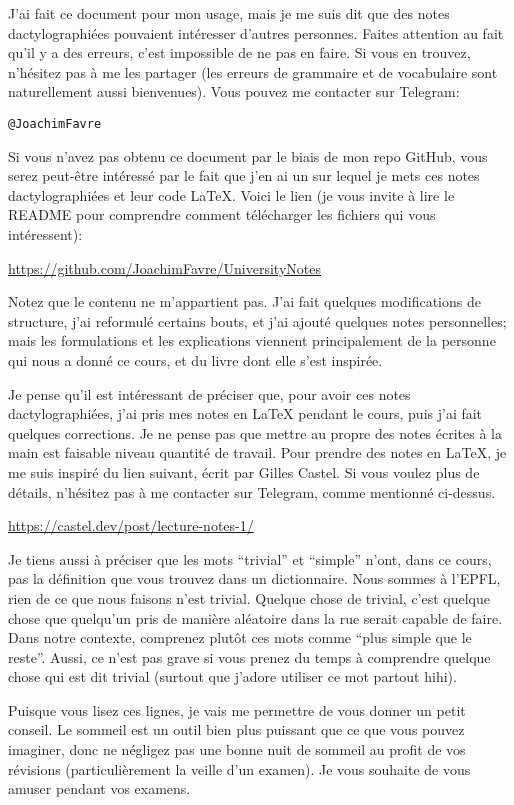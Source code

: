 J'ai fait ce document pour mon usage, mais je me suis dit que des notes dactylographiées pouvaient intéresser d'autres personnes. Faites attention au fait qu'il y a des erreurs, c'est impossible de ne pas en faire. Si vous en trouvez, n'hésitez pas à me les partager (les erreurs de grammaire et de vocabulaire sont naturellement aussi bienvenues). Vous pouvez me contacter sur Telegram:
\begin{center}
    \texttt{@JoachimFavre}
\end{center}

Si vous n'avez pas obtenu ce document par le biais de mon repo GitHub, vous serez peut-être intéressé par le fait que j'en ai un sur lequel je mets ces notes dactylographiées et leur code \LaTeX{}. Voici le lien (je vous invite à lire le README pour comprendre comment télécharger les fichiers qui vous intéressent):
\begin{center}
    \url{https://github.com/JoachimFavre/UniversityNotes}
\end{center}

Notez que le contenu ne m'appartient pas. J'ai fait quelques modifications de structure, j'ai reformulé certains bouts, et j'ai ajouté quelques notes personnelles; mais les formulations et les explications viennent principalement de la personne qui nous a donné ce cours, et du livre dont elle s'est inspirée.

Je pense qu'il est intéressant de préciser que, pour avoir ces notes dactylographiées, j'ai pris mes notes en \LaTeX{} pendant le cours, puis j'ai fait quelques corrections. Je ne pense pas que mettre au propre des notes écrites à la main est faisable niveau quantité de travail. Pour prendre des notes en \LaTeX{}, je me suis inspiré du lien suivant, écrit par Gilles Castel. Si vous voulez plus de détails, n'hésitez pas à me contacter sur Telegram, comme mentionné ci-dessus.
\begin{center}
    \url{https://castel.dev/post/lecture-notes-1/}
\end{center}

Je tiens aussi à préciser que les mots ``trivial'' et ``simple'' n'ont, dans ce cours, pas la définition que vous trouvez dans un dictionnaire. Nous sommes à l'EPFL, rien de ce que nous faisons n'est trivial. Quelque chose de trivial, c'est quelque chose que quelqu'un pris de manière aléatoire dans la rue serait capable de faire. Dans notre contexte, comprenez plutôt ces mots comme ``plus simple que le reste''. Aussi, ce n'est pas grave si vous prenez du temps à comprendre quelque chose qui est dit trivial (surtout que j'adore utiliser ce mot partout hihi).

Puisque vous lisez ces lignes, je vais me permettre de vous donner un petit conseil. Le sommeil est un outil bien plus puissant que ce que vous pouvez imaginer, donc ne négligez pas une bonne nuit de sommeil au profit de vos révisions (particulièrement la veille d'un examen). Je vous souhaite de vous amuser pendant vos examens.
